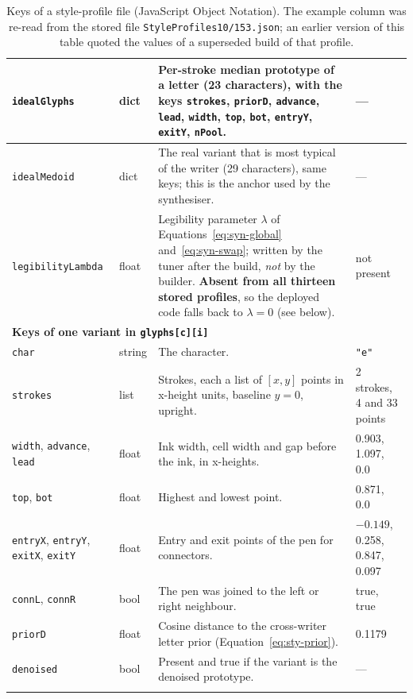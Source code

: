 {\begin{longtable}{|p{3.2cm}|p{1.6cm}|p{6.6cm}|p{2.5cm}|}
\hline
\texttt{idealGlyphs} & dict & Per-stroke median prototype of a letter (23 characters), with the keys \texttt{strokes}, \texttt{priorD}, \texttt{advance}, \texttt{lead}, \texttt{width}, \texttt{top}, \texttt{bot}, \texttt{entryY}, \texttt{exitY}, \texttt{nPool}. & --- \\
\hline
\texttt{idealMedoid} & dict & The real variant that is most typical of the writer (29 characters), same keys; this is the anchor used by the synthesiser. & --- \\
\hline
\texttt{legibilityLambda} & float & Legibility parameter $\lambda$ of Equations~\ref{eq:syn-global} and~\ref{eq:syn-swap}; written by the tuner after the build, \emph{not} by the builder. \textbf{Absent from all thirteen stored profiles}, so the deployed code falls back to $\lambda=0$ (see below). & not present \\
\hline
\multicolumn{4}{|l|}{\textbf{Keys of one variant in \texttt{glyphs[c][i]}}} \\
\hline
\texttt{char} & string & The character. & \texttt{"e"} \\
\hline
\texttt{strokes} & list & Strokes, each a list of $[x,y]$ points in x-height units, baseline $y=0$, upright. & 2 strokes, 4 and 33 points \\
\hline
\texttt{width}, \texttt{advance}, \texttt{lead} & float & Ink width, cell width and gap before the ink, in x-heights. & 0.903, 1.097, 0.0 \\
\hline
\texttt{top}, \texttt{bot} & float & Highest and lowest point. & 0.871, 0.0 \\
\hline
\texttt{entryX}, \texttt{entryY}, \texttt{exitX}, \texttt{exitY} & float & Entry and exit points of the pen for connectors. & $-0.149$, 0.258, 0.847, 0.097 \\
\hline
\texttt{connL}, \texttt{connR} & bool & The pen was joined to the left or right neighbour. & true, true \\
\hline
\texttt{priorD} & float & Cosine distance to the cross-writer letter prior (Equation~\ref{eq:sty-prior}). & 0.1179 \\
\hline
\texttt{denoised} & bool & Present and true if the variant is the denoised prototype. & --- \\
\hline
\caption{Keys of a style-profile file (JavaScript Object Notation). The example column was re-read from the stored file \texttt{StyleProfiles10/153.json}; an earlier version of this table quoted the values of a superseded build of that profile.}
\label{tab:sty-schema}
\end{longtable}
}

